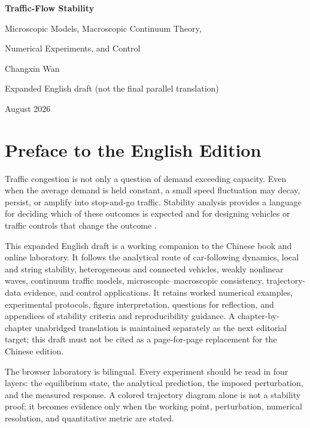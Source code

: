 \documentclass[11pt,a4paper,openany]{book}
\numberwithin{equation}{chapter}
\numberwithin{figure}{chapter}
\numberwithin{table}{chapter}
\begin{document}
\frontmatter
\begin{titlepage}
\centering
\vspace*{3.2cm}
{\sffamily\bfseries\color{navy}\fontsize{29}{34}\selectfont Traffic-Flow Stability\par}
\vspace{0.6cm}
{\sffamily\Large Microscopic Models, Macroscopic Continuum Theory,\par Numerical Experiments, and Control\par}
\vspace{2cm}
{\Large Changxin Wan\par}
\vfill
{\large Expanded English draft (not the final parallel translation)\par}
{\small August 2026\par}
\end{titlepage}

\chapter*{Preface to the English Edition}
Traffic congestion is not only a question of demand exceeding capacity. Even when the average demand is held constant, a small speed fluctuation may decay, persist, or amplify into stop-and-go traffic. Stability analysis provides a language for deciding which of these outcomes is expected and for designing vehicles or traffic controls that change the outcome \cite{treiber2013,wilson2011}.

This expanded English draft is a working companion to the Chinese book and online laboratory. It follows the analytical route of car-following dynamics, local and string stability, heterogeneous and connected vehicles, weakly nonlinear waves, continuum traffic models, microscopic--macroscopic consistency, trajectory-data evidence, and control applications. It retains worked numerical examples, experimental protocols, figure interpretation, questions for reflection, and appendices of stability criteria and reproducibility guidance. A chapter-by-chapter unabridged translation is maintained separately as the next editorial target; this draft must not be cited as a page-for-page replacement for the Chinese edition.

The browser laboratory is bilingual. Every experiment should be read in four layers: the equilibrium state, the analytical prediction, the imposed perturbation, and the measured response. A colored trajectory diagram alone is not a stability proof; it becomes evidence only when the working point, perturbation, numerical resolution, and quantitative metric are stated.
\end{document}
